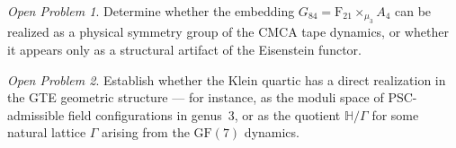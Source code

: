 \documentclass[11pt]{article}
\theoremstyle{remark}
\newtheorem{openprob}{Open Problem}
\newcommand{\GF}[1]{\ensuremath{\mathrm{GF}(#1)}}
\newcommand{\FineSeven}{\ensuremath{\mathrm{F}_{21}}}
\newcommand{\AltFour}{\ensuremath{A_4}}
\begin{document}
\begin{openprob}
Determine whether the embedding $G_{84} = \FineSeven \times_{\mu_3} \AltFour$
can be realized as a physical symmetry group of the CMCA tape dynamics, or
whether it appears only as a structural artifact of the Eisenstein functor.
\end{openprob}

\begin{openprob}
Establish whether the Klein quartic has a direct realization in the GTE
geometric structure — for instance, as the moduli space of PSC-admissible
field configurations in genus~3, or as the quotient $\mathbb{H}/\Gamma$ for
some natural lattice $\Gamma$ arising from the $\GF{7}$ dynamics.
\end{openprob}

\appendix
\end{document}
